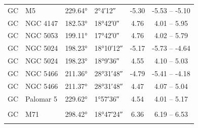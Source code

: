 \begin{table}[H]
\begin{tabular}[t]{l L{2cm} l l c c}
        GC                               & M5                       & \ang{229.64}              & \ang{+2;4;12}              & -5.30                  & -5.53 -- -5.10                   \\
        GC                               & NGC 4147                 & \ang{182.53}              & \ang{+18;42;0}             & 4.76                   & 4.01 -- 5.95                     \\
        GC                               & NGC 5053                 & \ang{199.11}              & \ang{+17;42;0}             & 4.76                   & 4.02 -- 5.79                     \\
        GC                               & NGC 5024                 & \ang{198.23}              & \ang{+18;10;12}            & -5.17                  & -5.73 -- -4.64                   \\
        GC                               & NGC 5024                 & \ang{198.23}              & \ang{+18;9;36}             & 4.55                   & 4.10 -- 5.03                     \\
        GC                               & NGC 5466                 & \ang{211.36}              & \ang{+28;31;48}            & -4.79                  & -5.41 -- -4.18                   \\
        GC                               & NGC 5466                 & \ang{211.37}              & \ang{+28;31;48}            & 4.47                   & 4.07 -- 5.04                     \\
        GC                               & Palomar 5                & \ang{229.62}              & \ang{+1;57;36}             & 4.54                   & 4.01 -- 5.17                     \\
        \addlinespace[2em]
        \midrule[0.5pt]
                                                                                                                                                                   \\
        \midrule[0.5pt]
        GC                               & M71                      & \ang{298.42}              & \ang{+18;47;24}            & 6.36                   & 6.19 -- 6.53                     \\
        \addlinespace[2em]
        \midrule[0.5pt]
                                                                                                                                                                   \\

\end{tabular}
\end{table}
